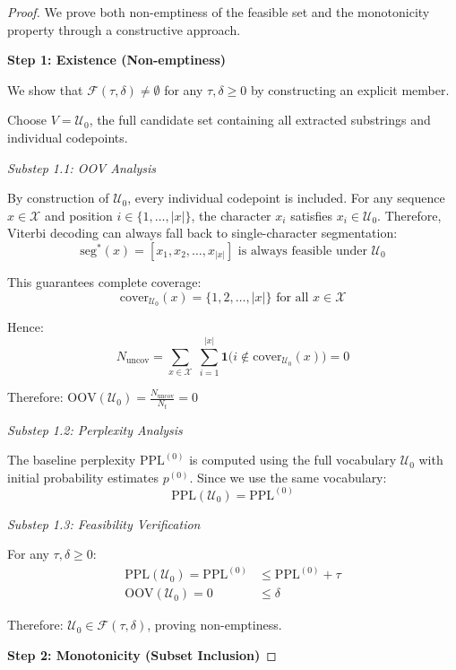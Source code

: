 \begin{proof}
	We prove both non-emptiness of the feasible set and the monotonicity property through a constructive approach.
	
	\textbf{Step 1: Existence (Non-emptiness)}
	
	We show that \(\mathcal F(\tau,\delta) \neq \emptyset\) for any \(\tau,\delta \ge 0\) by constructing an explicit member.
	
	Choose \(V = \mathcal U_0\), the full candidate set containing all extracted substrings and individual codepoints.
	
	\emph{Substep 1.1: OOV Analysis}
	
	By construction of \(\mathcal U_0\), every individual codepoint is included. For any sequence \(x \in \mathcal X\) and position \(i \in \{1,\ldots,|x|\}\), the character \(x_i\) satisfies \(x_i \in \mathcal U_0\). Therefore, Viterbi decoding can always fall back to single-character segmentation:
	\[
	\mathrm{seg}^{*}(x) = [x_1, x_2, \ldots, x_{|x|}] \text{ is always feasible under } \mathcal U_0
	\]
	
	This guarantees complete coverage:
	\[
	\mathrm{cover}_{\mathcal U_0}(x) = \{1, 2, \ldots, |x|\} \text{ for all } x \in \mathcal X
	\]
	
	Hence:
	\[
	N_{\mathrm{uncov}} = \sum_{x\in\mathcal X}\;\sum_{i=1}^{|x|} \mathbf1\bigl(i\not\in \mathrm{cover}_{\mathcal U_0}(x)\bigr) = 0
	\]
	
	Therefore: \(\mathrm{OOV}(\mathcal U_0) = \frac{N_{\mathrm{uncov}}}{N_{t}} = 0\)
	
	\emph{Substep 1.2: Perplexity Analysis}
	
	The baseline perplexity \(\mathrm{PPL}^{(0)}\) is computed using the full vocabulary \(\mathcal U_0\) with initial probability estimates \(p^{(0)}\). Since we use the same vocabulary:
	\[
	\mathrm{PPL}(\mathcal U_0) = \mathrm{PPL}^{(0)}
	\]
	
	\emph{Substep 1.3: Feasibility Verification}
	
	For any \(\tau,\delta \ge 0\):
	\begin{align}
	\mathrm{PPL}(\mathcal U_0) = \mathrm{PPL}^{(0)} &\le \mathrm{PPL}^{(0)} + \tau \\
	\mathrm{OOV}(\mathcal U_0) = 0 &\le \delta
	\end{align}
	
	Therefore: \(\mathcal U_0 \in \mathcal F(\tau,\delta)\), proving non-emptiness.
	
	\textbf{Step 2: Monotonicity (Subset Inclusion)}
	

\end{proof}
